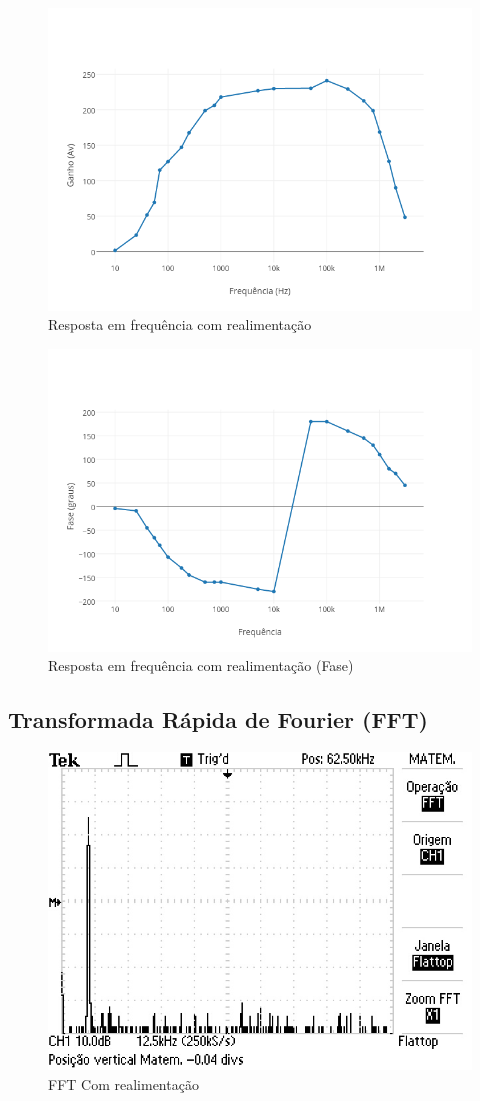 \documentclass[openright]{normas-utf-tex} %
\begin{document}
\begin{figure}[H]
\centering
\includegraphics[width=0.8\linewidth]{img/RespFreq_ComReal.png}
\caption{Resposta em frequência com realimentação}
\label{fig:resp_freq_com_real}
\end{figure}

\begin{figure}[H]
\centering
\includegraphics[width=0.8\linewidth]{img/RespFreq_ComReal_Fase.png}
\caption{Resposta em frequência com realimentação (Fase) }
\label{fig:resp_freq_com_real_fase}
\end{figure}


\subsection{Transformada Rápida de Fourier (FFT)}

\begin{figure}[H]
\centering
\includegraphics[width=0.8\linewidth]{img/FFT_ComReal.JPG}
\caption{FFT Com realimentação}
\label{fig:resp_freq_com_real_fase}
\end{figure}
\end{document}
